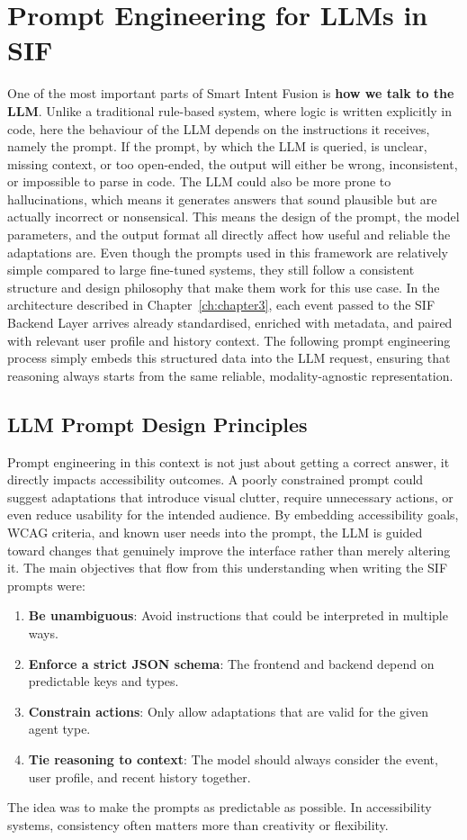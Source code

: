 \section{Prompt Engineering for LLMs in SIF}
One of the most important parts of Smart Intent Fusion is \textbf{how we talk to the LLM}.
Unlike a traditional rule-based system, where logic is written explicitly in code, here the behaviour of the LLM depends on the instructions it receives, namely the prompt.
If the prompt, by which the LLM is queried, is unclear, missing context, or too open-ended, the output will either be wrong, inconsistent, or impossible to parse in code.
The LLM could also be more prone to hallucinations, which means it generates answers that sound plausible but are actually incorrect or nonsensical. This means the design of the prompt, the model parameters, and the output format all directly affect how useful and reliable the adaptations are. Even though the prompts used in this framework are relatively simple compared to large fine-tuned systems, they still follow a consistent structure and design philosophy that make them work for this use case. In the architecture described in Chapter~\ref{ch:chapter3}, each event passed to the SIF Backend Layer arrives already standardised, enriched with metadata, and paired with relevant user profile and history context. The following prompt engineering process simply embeds this structured data into the LLM request, ensuring that reasoning always starts from the same reliable, modality-agnostic representation.

\subsection{LLM Prompt Design Principles}
Prompt engineering in this context is not just about getting a correct answer, it directly impacts accessibility outcomes. A poorly constrained prompt could suggest adaptations that introduce visual clutter, require unnecessary actions, or even reduce usability for the intended audience. By embedding accessibility goals, WCAG criteria, and known user needs into the prompt, the LLM is guided toward changes that genuinely improve the interface rather than merely altering it.
The main objectives that flow from this understanding when writing the SIF prompts were:
\begin{enumerate}
    \item \textbf{Be unambiguous}: Avoid instructions that could be interpreted in multiple ways.
    \item \textbf{Enforce a strict JSON schema}: The frontend and backend depend on predictable keys and types.
    \item \textbf{Constrain actions}: Only allow adaptations that are valid for the given agent type.
    \item \textbf{Tie reasoning to context}: The model should always consider the event, user profile, and recent history together.
\end{enumerate}
The idea was to make the prompts as predictable as possible. In accessibility systems, consistency often matters more than creativity or flexibility.

